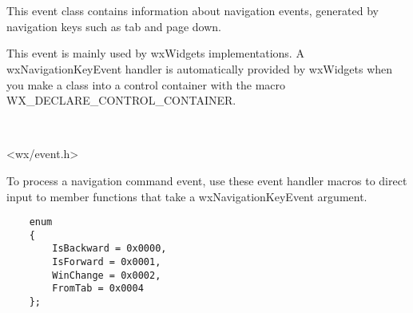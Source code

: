 \section{}\label{wxnavigationkeyevent}

This event class contains information about navigation events,
generated by navigation keys such as tab and page down.

This event is mainly used by wxWidgets implementations. A
wxNavigationKeyEvent handler is automatically provided by wxWidgets
when you make a class into a control container with the macro WX\_DECLARE\_CONTROL\_CONTAINER.


\\


<wx/event.h>




To process a navigation command event, use these event handler macros to direct input to member
functions that take a wxNavigationKeyEvent argument.

\twocolwidtha{7cm}
\begin{twocollist}\itemsep=0pt
\end{twocollist}%


\begin{verbatim}
    enum
    {
        IsBackward = 0x0000,
        IsForward = 0x0001,
        WinChange = 0x0002,
        FromTab = 0x0004
    };
\end{verbatim}


\\



\label{wxnavigationkeyeventctor}



